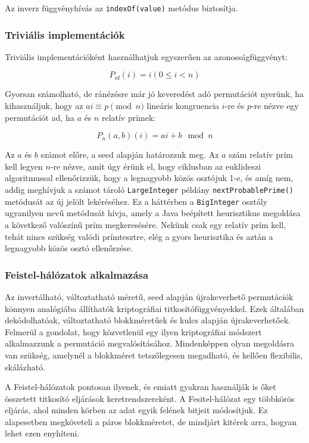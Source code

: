 \documentclass[
    parspace,
    noindent,
    nohyp,
]{elteiktdk}[2023/04/10]
\begin{document}
Az inverz függvényhívás az \texttt{indexOf(value)} metódus biztosítja.

\subsubsection{Triviális implementációk}

Triviális implementációként használhatjuk egyszerűen az azonosságfüggvényt:

$$
P_{id}(i) = i (0 \leq i < n)
$$

Gyorsan számolható, de ránézésre már jó keveredést adó permutációt nyerünk, ha kihasználjuk, hogy az $ai \equiv p \pmod{n}$ lineáris kongruencia
$i$-re és $p$-re nézve egy permutációt ad, ha $a$ és $n$ relatív prímek:

$$
P_n(a,b)(i) = ai + b \mod n
$$

Az $a$ és $b$ számot előre, a seed alapján határozzuk meg.
Az $a$ szám relatív prím kell legyen $n$-re nézve, amit úgy érünk el, hogy ciklusban az euklideszi algoritmussal ellenőrizzük, hogy a legnagyobb közös osztójuk 1-e,
és amíg nem, addig meghívjuk a számot tároló \texttt{LargeInteger} példány \texttt{nextProbablePrime()} metódusát az új jelölt lekéréséhez.
Ez a háttérben a \texttt{BigInteger} osztály ugyanilyen nevű metódusát hívja, amely a Java beépített heurisztikus megoldása a következő valószínű prím megkeresésére.
Nekünk csak egy relatív prím kell, tehát nincs szükség valódi prímtesztre, elég a gyors heurisztika és aztán a legnagyobb közös osztó ellenőrzése.

\subsubsection{Feistel-hálózatok alkalmazása}

Az invertálható, változtatható méretű, seed alapján újrakeverhető permutációk könnyen analógiába állíthatók kriptográfiai titkosítófüggvényekkel.
Ezek általában dekódolhatóak, változtatható blokkméretűek és kulcs alapján újrakeverhetőek.
Felmerül a gondolat, hogy közvetlenül egy ilyen kriptográfiai módszert alkalmazzunk a permutáció megvalósításához.
Mindenképpen olyan megoldásra van szükség, amelynél a blokkméret tetszőlegesen megadható, és kellően flexibilis, skálázható.

A Feistel-hálózatok pontosan ilyenek, és emiatt gyakran használják is őket összetett titkosító eljárások keretrendszereként.
A Fesitel-hálózat egy többkörös eljárás, ahol minden körben az adat egyik felének bitjeit módosítjuk.
Ez alapesetben megköveteli a páros blokkméretet, de mindjárt kitérek arra, hogyan lehet ezen enyhíteni.
\end{document}
